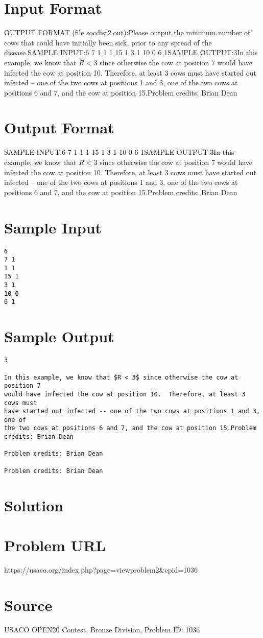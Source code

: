 \documentclass[12pt]{article}
\begin{document}
\section*{Input Format}
OUTPUT FORMAT (file socdist2.out):Please output the minimum number of cows that could have initially been sick,
prior to any spread of the disease.SAMPLE INPUT:6
7 1
1 1
15 1
3 1
10 0
6 1SAMPLE OUTPUT:3In this example, we know that $R < 3$ since otherwise the cow at position 7
would have infected the cow at position 10.  Therefore, at least 3 cows must
have started out infected -- one of the two cows at positions 1 and 3, one of
the two cows at positions 6 and 7, and the cow at position 15.Problem credits: Brian Dean

\section*{Output Format}
SAMPLE INPUT:6
7 1
1 1
15 1
3 1
10 0
6 1SAMPLE OUTPUT:3In this example, we know that $R < 3$ since otherwise the cow at position 7
would have infected the cow at position 10.  Therefore, at least 3 cows must
have started out infected -- one of the two cows at positions 1 and 3, one of
the two cows at positions 6 and 7, and the cow at position 15.Problem credits: Brian Dean

\section*{Sample Input}
\begin{verbatim}
6
7 1
1 1
15 1
3 1
10 0
6 1
\end{verbatim}

\section*{Sample Output}
\begin{verbatim}
3

In this example, we know that $R < 3$ since otherwise the cow at position 7
would have infected the cow at position 10.  Therefore, at least 3 cows must
have started out infected -- one of the two cows at positions 1 and 3, one of
the two cows at positions 6 and 7, and the cow at position 15.Problem credits: Brian Dean

Problem credits: Brian Dean

Problem credits: Brian Dean
\end{verbatim}

\section*{Solution}


\section*{Problem URL}
https://usaco.org/index.php?page=viewproblem2&cpid=1036

\section*{Source}
USACO OPEN20 Contest, Bronze Division, Problem ID: 1036
\end{document}
